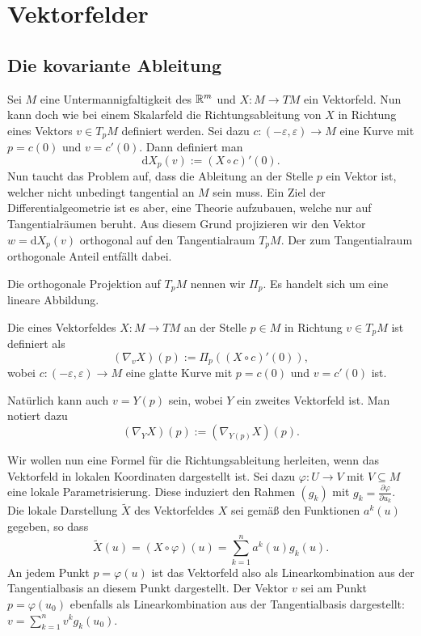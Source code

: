 \section{Vektorfelder}

\subsection{Die kovariante Ableitung}

Sei $M$ eine Untermannigfaltigkeit des $\mathbb R^m$ und $X\colon M\to TM$
ein Vektorfeld. Nun kann doch wie bei einem Skalarfeld die
Richtungsableitung von $X$ in Richtung
eines Vektors $v\in T_p M$ definiert werden. Sei dazu
$c\colon (-\varepsilon,\varepsilon)\to M$ eine Kurve
mit $p=c(0)$ und $v=c'(0)$. Dann definiert man%
\begin{equation}
\mathrm dX_p(v) := (X\circ c)'(0).
\end{equation}
Nun taucht das Problem auf, dass die Ableitung an der Stelle $p$
ein Vektor ist, welcher nicht unbedingt tangential an $M$ sein muss.
Ein Ziel der Differentialgeometrie ist es aber, eine Theorie aufzubauen,
welche nur auf Tangentialräumen beruht. Aus diesem Grund projizieren
wir den Vektor $w=\mathrm dX_p(v)$ orthogonal auf den Tangentialraum
$T_p M$. Der zum Tangentialraum orthogonale Anteil entfällt dabei.

Die orthogonale Projektion auf $T_p M$ nennen wir $\Pi_p$. Es handelt
sich um eine lineare Abbildung.

\begin{definition}
Die  eines Vektorfeldes $X\colon M\to TM$
an der Stelle $p\in M$ in Richtung $v\in T_p M$ ist definiert als
\begin{equation}
(\nabla_v X)(p) := \Pi_p((X\circ c)'(0)),
\end{equation}
wobei $c\colon (-\varepsilon,\varepsilon)\to M$ eine glatte Kurve
mit $p=c(0)$ und $v=c'(0)$ ist.
\end{definition}

\noindent
Natürlich kann auch $v=Y(p)$ sein, wobei $Y$ ein zweites Vektorfeld
ist. Man notiert dazu
\begin{equation}
(\nabla_Y X)(p) := (\nabla_{Y(p)} X)(p).
\end{equation}

\noindent
Wir wollen nun eine Formel für die Richtungsableitung herleiten,
wenn das Vektorfeld in lokalen Koordinaten dargestellt ist. Sei
dazu $\varphi\colon U\to V$ mit $V\subseteq M$ eine lokale
Parametrisierung. Diese induziert den Rahmen $(g_k)$ mit
$g_k = \frac{\partial\varphi}{\partial u_k}$. Die lokale
Darstellung $\tilde X$ des Vektorfeldes $X$ sei gemäß den
Funktionen $a^k(u)$ gegeben, so dass%
\begin{equation}
\tilde X(u) = (X\circ\varphi)(u) = \sum_{k=1}^n a^k(u)g_k(u).
\end{equation}
An jedem Punkt $p=\varphi(u)$ ist das Vektorfeld also als
Linearkombination aus der Tangentialbasis an diesem Punkt dargestellt.
Der Vektor $v$ sei am Punkt $p=\varphi(u_0)$ ebenfalls als
Linearkombination aus der Tangentialbasis dargestellt:
$v = \sum_{k=1}^n v^k g_k(u_0)$.

